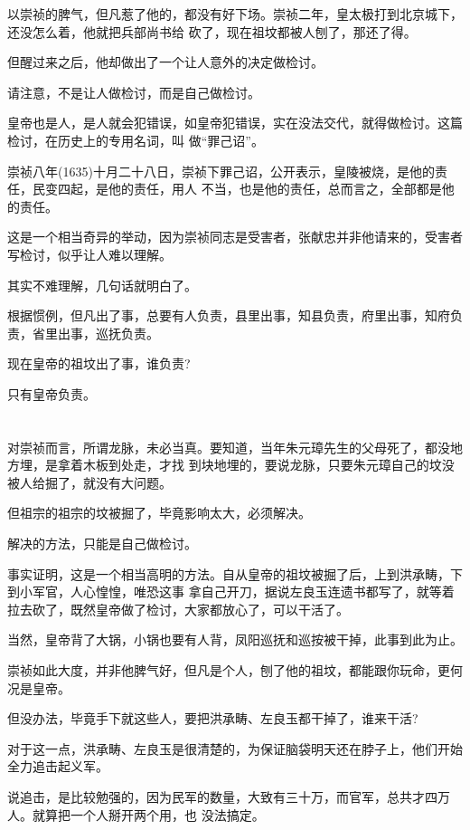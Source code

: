 \documentclass[11pt,a4paper,onecolumn]{article}
\begin{document}
以崇祯的脾气，但凡惹了他的，都没有好下场。崇祯二年，皇太极打到北京城下，还没怎么着，他就把兵部尚书给
砍了，现在祖坟都被人刨了，那还了得。

但醒过来之后，他却做出了一个让人意外的决定\myrule 做检讨。

请注意，不是让人做检讨，而是自己做检讨。

皇帝也是人，是人就会犯错误，如皇帝犯错误，实在没法交代，就得做检讨。这篇检讨，在历史上的专用名词，叫
做``罪己诏''。

崇祯八年(1635)十月二十八日，崇祯下罪己诏，公开表示，皇陵被烧，是他的责任，民变四起，是他的责任，用人
不当，也是他的责任，总而言之，全部都是他的责任。

这是一个相当奇异的举动，因为崇祯同志是受害者，张献忠并非他请来的，受害者写检讨，似乎让人难以理解。

其实不难理解，几句话就明白了。

根据惯例，但凡出了事，总要有人负责，县里出事，知县负责，府里出事，知府负责，省里出事，巡抚负责。

现在皇帝的祖坟出了事，谁负责?

只有皇帝负责。

\section[\thesection]{}

对崇祯而言，所谓龙脉，未必当真。要知道，当年朱元璋先生的父母死了，都没地方埋，是拿着木板到处走，才找
到块地埋的，要说龙脉，只要朱元璋自己的坟没被人给掘了，就没有大问题。

但祖宗的祖宗的坟被掘了，毕竟影响太大，必须解决。

解决的方法，只能是自己做检讨。

事实证明，这是一个相当高明的方法。自从皇帝的祖坟被掘了后，上到洪承畴，下到小军官，人心惶惶，唯恐这事
拿自己开刀，据说左良玉连遗书都写了，就等着拉去砍了，既然皇帝做了检讨，大家都放心了，可以干活了。

当然，皇帝背了大锅，小锅也要有人背，凤阳巡抚和巡按被干掉，此事到此为止。

崇祯如此大度，并非他脾气好，但凡是个人，刨了他的祖坟，都能跟你玩命，更何况是皇帝。

但没办法，毕竟手下就这些人，要把洪承畴、左良玉都干掉了，谁来干活?

对于这一点，洪承畴、左良玉是很清楚的，为保证脑袋明天还在脖子上，他们开始全力追击起义军。

说追击，是比较勉强的，因为民军的数量，大致有三十万，而官军，总共才四万人。就算把一个人掰开两个用，也
没法搞定。
\end{document}
